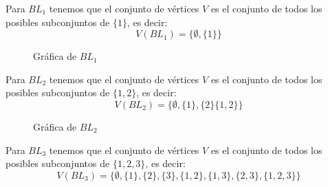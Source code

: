 \documentclass[12pt]{article}
\begin{document}
Para $BL_1$ tenemos que el conjunto de vértices $V$ es el conjunto de todos los posibles subconjuntos de $\{1\}$, es decir:
\[V(BL_1) = \{\emptyset, \{1\}\}\]

\begin{figure}[h!]
    \centering
    \begin{minipage}{0.4\textwidth}
        \centering
        \caption{Gráfica de $BL_1$}
    \end{minipage}
\end{figure}

Para $BL_2$ tenemos que el conjunto de vértices $V$ es el conjunto de todos los posibles subconjuntos de $\{1, 2\}$, es decir:
\[V(BL_2) = \{\emptyset, \{1\}, \{2\} \{1, 2\}\}\]

\begin{figure}[h!]
    \centering
    \begin{minipage}{0.4\textwidth}
        \centering
        \caption{Gráfica de $BL_2$}
    \end{minipage}
\end{figure}

Para $BL_3$ tenemos que el conjunto de vértices $V$ es el conjunto de todos los posibles subconjuntos de $\{1, 2, 3\}$, es decir:
\[V(BL_3) = \{\emptyset, \{1\}, \{2\}, \{3\}, \{1, 2\}, \{1, 3\}, \{2, 3\},\{1, 2, 3\}\}\]
\end{document}

